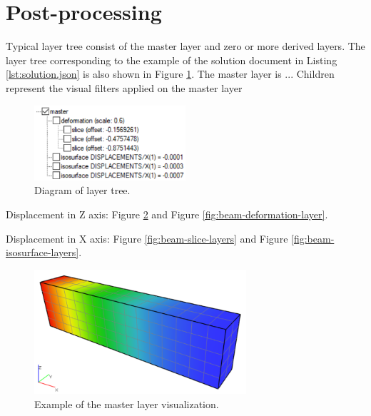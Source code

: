 \section{Post-processing}
\label{sec:postprocessing}

Typical layer tree consist of the master layer and zero or more derived layers. The layer tree corresponding to the example of the solution document in Listing \ref{lst:solution.json} is also shown in Figure \ref{fig:layers-tree}. The master layer is ... Children represent the visual filters applied on the master layer

\begin{figure}[H]
    \centering
    \includegraphics[width=0.5\textwidth]{figures/chapter-data-management/layers-tree-diagram}
    \decoRule
    \caption{Diagram of layer tree.}
    \label{fig:layers-tree}
\end{figure}



Displacement in Z axis: Figure \ref{fig:beam-master-layer} and Figure \ref{fig:beam-deformation-layer}.

Displacement in X axis: Figure \ref{fig:beam-slice-layers} and Figure \ref{fig:beam-isosurface-layers}.

\begin{figure}[H]
    \centering
    \includegraphics[width=0.7\textwidth]{figures/chapter-data-management/beam-master-layer}
    \decoRule
    \caption{Example of the master layer visualization.}
    \label{fig:beam-master-layer}
\end{figure}

